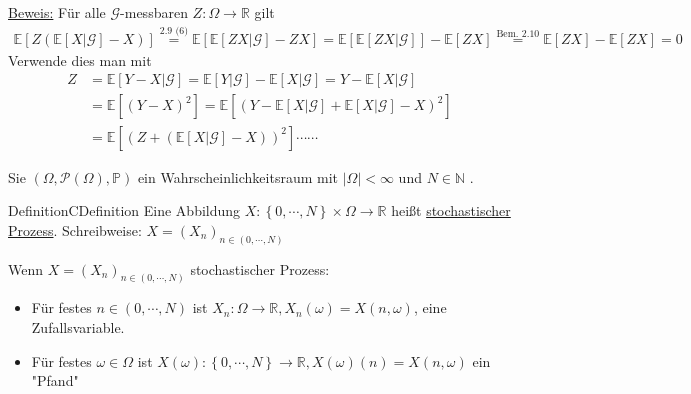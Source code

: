 \underline{Beweis:}
Für alle $ \mathcal{G}$-messbaren $ Z: \Omega \to \mathbb{R} $ gilt
\begin{align*}
	\mathbb{E} \left[ Z \left( \mathbb{E} \left[ X | \mathcal{G} \right] - X \right) \right] \stackrel{ \text{2.9 (6)}}{=} 
	\mathbb{E} \left[ \mathbb{E} \left[ Z X | \mathcal{G} \right] - Z X \right] = \mathbb{E} \left[ \mathbb{E} \left[ ZX | \mathcal{G}
	\right]\right] - \mathbb{E} \left[ Z X \right] \stackrel{ \text{Bem. 2.10}}{=} \mathbb{E} \left[ Z X \right] - \mathbb{E} \left[ Z X \right] = 0
\end{align*}
Verwende dies man mit 
\begin{align*}
Z &= \mathbb{E} \left[ Y - X | \mathcal{G} \right] = \mathbb{E} \left[ Y | \mathcal{G} \right] - \mathbb{E} \left[ X | \mathcal{G} \right]
= Y - \mathbb{E} \left[ X | \mathcal{G} \right] \\
	&= \mathbb{E} \left[ \left( Y - X \right)^{2} \right] = \mathbb{E} \left[ \left( Y - \mathbb{E} \left[ X | \mathcal{G} \right] + \mathbb{E} \left[ X | \mathcal{G} \right] - X \right)^{2} \right] \\
	&=\mathbb{E} \left[ \left( Z + \left( \mathbb{E} \left[ X | \mathcal{G} \right] - X \right) \right)^{2} \right] \cdots \cdots
\end{align*}

Sie  $ \left( \Omega , \mathcal{P} (\Omega), \mathbb{P}  \right) $ ein Wahrscheinlichkeitsraum   mit 
$ \left| \Omega  \right| < \infty $ und $ N \in \mathbb{N} $ . 

\begin{ibox}[3.1]{Definition}{CDefinition}
	Eine Abbildung $ X : \left\{ 0 , \cdots, N \right\} \times \Omega \to \mathbb{R} $ heißt \underline{stochastischer Prozess}.
	Schreibweise: $ X = \left( X_n \right)_{n \in \left( 0 , \cdots, N \right)} $ 
\end{ibox}
Wenn  $ X = \left( X_n \right)_{n \in \left( 0 , \cdots, N \right)} $ stochastischer Prozess:
\begin{itemize}
	\item Für festes $ n \in \left( 0 , \cdots, N \right) $ ist $ X_n : \Omega \to \mathbb{R}, X_n (\omega) = X (n,\omega) $, eine 
		Zufallsvariable. 
	\item Für festes $ \omega \in \Omega $ ist $ X (\omega): \left\{ 0 , \cdots, N \right\} \to \mathbb{R}, X (\omega) (n) = X (n,\omega) $ 
		ein "Pfand"
\end{itemize}

